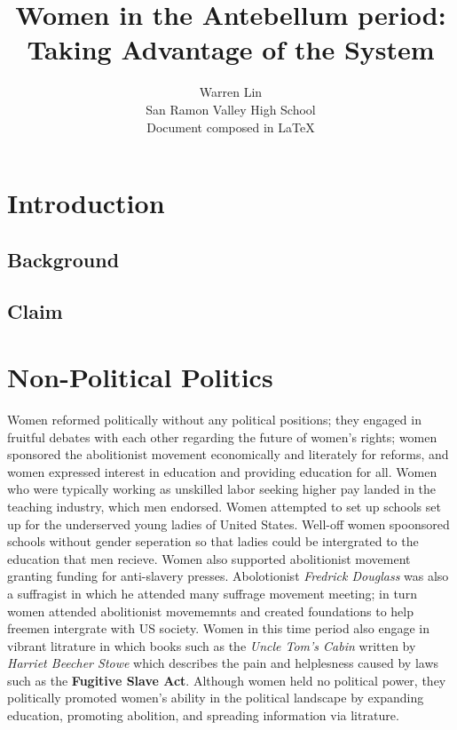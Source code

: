 \documentclass{article}
\title{Women in the Antebellum period: Taking Advantage of the System}
\author{Warren Lin\\ San Ramon Valley High School \\ Document composed in \LaTeX{}}
\begin{document}
\maketitle
\newpage

\begin{abstract}


\end{abstract}

\newpage

\doublespacing
\tableofcontents
\singlespacing

\newpage

\section{Introduction}
\subsection{Background}
\subsection{Claim}

\section{Non-Political Politics}
Women reformed politically without any political positions; they engaged in fruitful debates with each other regarding the future of women's rights; women sponsored the abolitionist movement economically and literately for reforms, and women expressed interest in education and providing education for all. Women who were typically working as unskilled labor seeking higher pay landed in the teaching industry, which men endorsed. Women attempted to set up schools set up for the underserved young ladies of United States. Well-off women spoonsored schools without gender seperation so that ladies could be intergrated to the education that men recieve. Women also supported abolitionist movement granting funding for anti-slavery presses. Abolotionist \emph{Fredrick Douglass} was also a suffragist in which he attended many suffrage movement meeting; in turn women attended abolitionist movememnts and created foundations to help freemen intergrate with US society. Women in this time period also engage in vibrant litrature in which books such as the \emph{Uncle Tom's Cabin} written by \emph{Harriet Beecher Stowe} which describes the pain and helplesness caused by laws such as the \textbf{Fugitive Slave Act}. Although women held no political power, they politically promoted women's ability in the political landscape by expanding education, promoting abolition, and spreading information via litrature.
\end{document}
